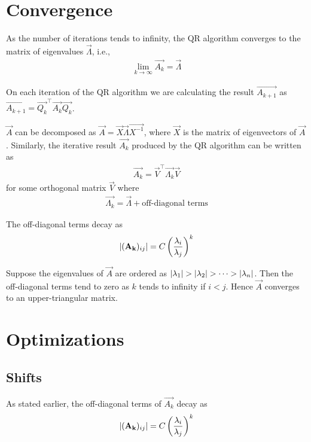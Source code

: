 \documentclass{article}
\begin{document}
\section{Convergence}

As the number of iterations tends to infinity, the
QR algorithm converges to the matrix of eigenvalues $\vec{\Lambda}$, i.e.,
\begin{align}
    \lim_{k \to \infty} \vec{A_k} = \vec{\Lambda}
\end{align}

On each iteration of the QR algorithm we are calculating the result $\vec{A_{k+1}}$
as $\vec{A_{k+1}} = \vec{Q_k}^\top\vec{A_k}\vec{Q_k}$.

$\vec{A}$ can be decomposed as $\vec{A} = \vec{X}\vec{\Lambda}\vec{X^{-1}}$, where
$\vec{X}$ is the matrix of eigenvectors of $\vec{A}$. Similarly, the iterative result
$\vec{A_k}$ produced by the QR algorithm can be written as
\begin{align}
    \vec{A_k} = \vec{V}^\top\vec{\Lambda_k}\vec{V}
\end{align}
for some orthogonal matrix $\vec{V}$ where
\begin{align}
    \vec{\Lambda_k} = \vec{\Lambda} + \text{off-diagonal terms}
\end{align}

The off-diagonal terms decay as
\begin{align}
    \left\vert(\mathbf{A_k})_{ij}\right\vert = C \left(\frac{\lambda_i}{\lambda_j}\right)^k
\end{align}

Suppose the eigenvalues of $\vec{A}$ are ordered as $\left\vert\lambda_1\right\vert > \left\vert\lambda_2\right\vert > \dots > \left\vert\lambda_n\right\vert$.
Then the off-diagonal terms tend to zero as $k$ tends to infinity if $i < j$. Hence $\vec{A}$
converges to an upper-triangular matrix.

\section{Optimizations}

\subsection{Shifts}

As stated earlier, the off-diagonal terms of $\vec{A_k}$ decay as
\begin{align}
    \left\vert(\mathbf{A_k})_{ij}\right\vert = C \left(\frac{\lambda_i}{\lambda_j}\right)^k
\end{align}
\end{document}
